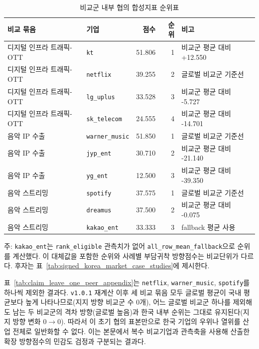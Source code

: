 \documentclass[11pt,a4paper]{report}
\begin{document}
\begin{table}[H]
\centering
\caption{비교군 내부 협의 합성지표 순위표}
\label{tab:claim_peer_rank_appendix}
\footnotesize
\setlength{\tabcolsep}{3pt}
\begin{tabular}{p{3.4cm}p{2.0cm}rrp{3.8cm}}
\toprule
\rowcolor{ReportTableHead}
비교 묶음 & 기업 & 점수 & 순위 & 비고 \\
\midrule
디지털 인프라 트래픽-OTT & \texttt{kt} & 51.806 & 1 & 비교군 평균 대비 +12.550 \\
디지털 인프라 트래픽-OTT & \texttt{netflix} & 39.255 & 2 & 글로벌 비교군 기준선 \\
디지털 인프라 트래픽-OTT & \texttt{lg\_uplus} & 33.528 & 3 & 비교군 평균 대비 -5.727 \\
디지털 인프라 트래픽-OTT & \texttt{sk\_telecom} & 24.555 & 4 & 비교군 평균 대비 -14.701 \\
음악 IP 수출 & \texttt{warner\_music} & 51.850 & 1 & 글로벌 비교군 기준선 \\
음악 IP 수출 & \texttt{jyp\_ent} & 30.710 & 2 & 비교군 평균 대비 -21.140 \\
음악 IP 수출 & \texttt{yg\_ent} & 12.500 & 3 & 비교군 평균 대비 -39.350 \\
음악 스트리밍 & \texttt{spotify} & 37.575 & 1 & 글로벌 비교군 기준선 \\
음악 스트리밍 & \texttt{dreamus} & 37.500 & 2 & 비교군 평균 대비 -0.075 \\
음악 스트리밍 & \texttt{kakao\_ent} & 33.333 & 3 & fallback 평균 사용 \\
\bottomrule
\end{tabular}

\vspace{0.3em}
{\par\raggedright\footnotesize 주: \texttt{kakao\_ent}는 \texttt{rank\_eligible} 관측치가 없어 \texttt{all\_row\_mean\_fallback}으로 순위를 계산했다. 이 대체값을 포함한 순위와 사례별 부담귀착 방향점수는 비교단위가 다르다. 후자는 표~\ref{tab:signed_korea_market_case_studies}에 제시한다.\par}
\end{table}

표~\ref{tab:claim_leave_one_peer_appendix}는 \texttt{netflix}, \texttt{warner\_music}, \texttt{spotify}를 하나씩 제외한 결과다. \texttt{v1.0.1} 재계산 이후 세 비교 묶음 모두 글로벌 평균이 국내 평균보다 높게 나타나므로(지지 방향 비교군 수 0개), 어느 글로벌 비교군 하나를 제외해도 남는 두 비교군의 격차 방향(글로벌 높음)과 한국 내부 순위는 그대로 유지된다(지지 방향 변화 $0 \rightarrow 0$). 따라서 이 초기 협의 표본만으로 한국 기업의 우위나 열위를 산업 전체로 일반화할 수 없다. 이는 본문에서 복수 비교기업과 관측축을 사용해 산출한 확장 방향점수의 민감도 검정과 구분되는 결과다.
\end{document}
